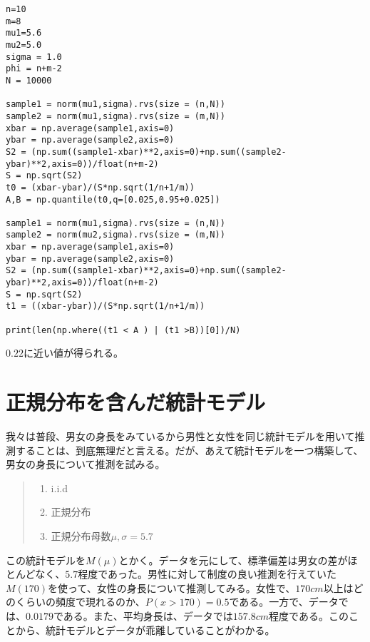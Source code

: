 \begin{lstlisting}
n=10
m=8
mu1=5.6
mu2=5.0
sigma = 1.0
phi = n+m-2
N = 10000

sample1 = norm(mu1,sigma).rvs(size = (n,N))
sample2 = norm(mu1,sigma).rvs(size = (m,N))
xbar = np.average(sample1,axis=0)
ybar = np.average(sample2,axis=0)
S2 = (np.sum((sample1-xbar)**2,axis=0)+np.sum((sample2-ybar)**2,axis=0))/float(n+m-2)
S = np.sqrt(S2)
t0 = (xbar-ybar)/(S*np.sqrt(1/n+1/m))
A,B = np.quantile(t0,q=[0.025,0.95+0.025])

sample1 = norm(mu1,sigma).rvs(size = (n,N))
sample2 = norm(mu2,sigma).rvs(size = (m,N))
xbar = np.average(sample1,axis=0)
ybar = np.average(sample2,axis=0)
S2 = (np.sum((sample1-xbar)**2,axis=0)+np.sum((sample2-ybar)**2,axis=0))/float(n+m-2)
S = np.sqrt(S2)
t1 = ((xbar-ybar))/(S*np.sqrt(1/n+1/m))

print(len(np.where((t1 < A ) | (t1 >B))[0])/N)    
\end{lstlisting}
$0.22$に近い値が得られる。









\section{正規分布を含んだ統計モデル}
我々は普段、男女の身長をみているから男性と女性を同じ統計モデルを用いて推測することは、到底無理だと言える。だが、あえて統計モデルを一つ構築して、男女の身長について推測を試みる。
\begin{quote}
    \begin{enumerate}[(1)]
\item i.i.d
\item 正規分布
\item 正規分布母数$\mu,\sigma=5.7$
\end{enumerate}
\end{quote}
この統計モデルを$M(\mu)$とかく。データを元にして、標準偏差は男女の差がほとんどなく、$5.7$程度であった。男性に対して制度の良い推測を行えていた$M(170)$を使って、女性の身長について推測してみる。女性で、$170cm$以上はどのくらいの頻度で現れるのか、$P(x>170)=0.5$である。一方で、データでは、$0.0179$である。また、平均身長は、データでは$157.8cm$程度である。このことから、統計モデルとデータが乖離していることがわかる。

